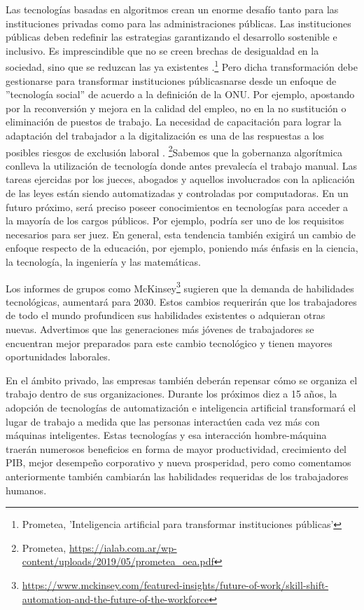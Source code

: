 \documentclass[12pt]{report} %
\begin{document}
Las tecnologías basadas en algoritmos crean un enorme desafío tanto para las instituciones privadas como para las administraciones públicas. Las instituciones públicas deben redefinir las estrategias garantizando el desarrollo sostenible e inclusivo. Es imprescindible que no se creen brechas de desigualdad en la sociedad, sino que se reduzcan las ya existentes .\footnote{\cite{Corvalan2018} Prometea, 'Inteligencia artificial para transformar instituciones públicas'} Pero dicha transformación debe gestionarse para transformar instituciones públicasnarse desde un enfoque de ''tecnología social'' de acuerdo a la definición de la ONU. Por ejemplo, apostando por la reconversión y mejora en la calidad del empleo, no en la no sustitución o eliminación de puestos de trabajo. La necesidad de capacitación para lograr la adaptación del trabajador a la digitalización es una de las respuestas a los posibles riesgos de exclusión laboral . \footnote{Prometea, \url{https://ialab.com.ar/wp-content/uploads/2019/05/prometea\_oea.pdf}}Sabemos que la gobernanza algorítmica conlleva la utilización de tecnología donde antes prevalecía el trabajo manual. Las tareas ejercidas por los jueces, abogados y aquellos involucrados con la aplicación de las leyes están siendo automatizadas y controladas por computadoras. En un futuro próximo, será preciso poseer conocimientos en tecnologías para acceder a la mayoría de los cargos públicos. Por ejemplo, podría ser uno de los requisitos necesarios para ser juez. En general, esta tendencia también exigirá un cambio de enfoque respecto de la educación, por ejemplo, poniendo más énfasis en la ciencia, la tecnología, la ingeniería y las matemáticas. 

Los informes de grupos como McKinsey\footnote{\url{https://www.mckinsey.com/featured-insights/future-of-work/skill-shift-automation-and-the-future-of-the-workforce}}  sugieren que la demanda de habilidades tecnológicas, aumentará para 2030. Estos cambios requerirán que los trabajadores de todo el mundo profundicen sus habilidades existentes o adquieran otras nuevas. Advertimos que las generaciones más jóvenes de trabajadores se encuentran mejor preparados para este cambio tecnológico y tienen mayores oportunidades laborales. 

En el ámbito privado, las empresas también deberán repensar cómo se organiza el trabajo dentro de sus organizaciones. Durante los próximos diez a 15 años, la adopción de tecnologías de automatización e inteligencia artificial transformará el lugar de trabajo a medida que las personas interactúen cada vez más con máquinas inteligentes. Estas tecnologías y esa interacción hombre-máquina traerán numerosos beneficios en forma de mayor productividad, crecimiento del PIB, mejor desempeño corporativo y nueva prosperidad, pero como comentamos anteriormente también cambiarán las habilidades requeridas de los trabajadores humanos.
\end{document}
